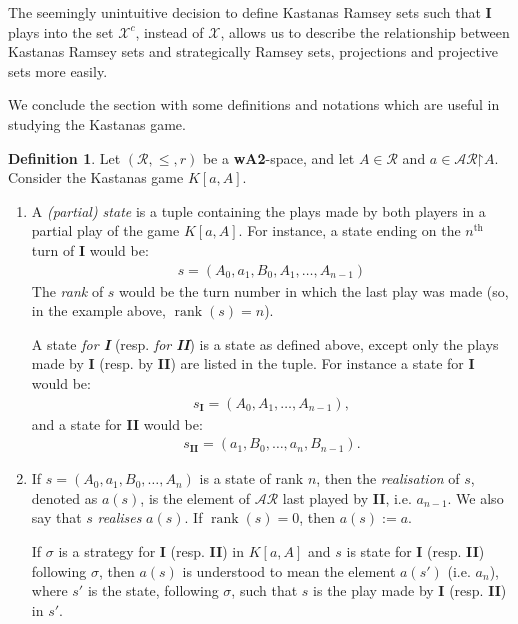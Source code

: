 \documentclass[11pt,reqno]{amsart}
\theoremstyle{plain}
\numberwithin{equation}{section}
\theoremstyle{definition}
\newtheorem{definition}[theorem]{Definition}
\newcommand{\func}{\operatorname}
\newcommand{\cal}{\mathcal}
\newcommand{\rank}{\func{rank}}
\newcommand{\restrictedto}{\mathord{\upharpoonright}}
\newcommand{\X}{\cal{X}}
\begin{document}
The seemingly unintuitive decision to define Kastanas Ramsey sets such that \textbf{I} plays into the set $\X^c$, instead of $\X$, allows us to describe the relationship between Kastanas Ramsey sets and strategically Ramsey sets, projections and projective sets more easily.

We conclude the section with some definitions and notations which are useful in studying the Kastanas game. 

\begin{definition}
\label{def:states}
    Let $(\cal{R},\leq,r)$ be a \textbf{wA2}-space, and let $A \in \cal{R}$ and $a \in \cal{AR}\restrictedto A$. Consider the Kastanas game $K[a,A]$.
    \begin{enumerate}
        \item A \emph{(partial) state} is a tuple containing the plays made by both players in a partial play of the game $K[a,A]$. For instance, a state ending on the $n^\text{th}$ turn of \textbf{I} would be:
        \begin{align*}
            s = (A_0,a_1,B_0,A_1,\dots,A_{n-1})
        \end{align*}
        The \emph{rank} of $s$ would be the turn number in which the last play was made (so, in the example above, $\rank(s) = n$).

        A state \emph{for \textbf{I}} (resp. \emph{for \textbf{II}}) is a state as defined above, except only the plays made by \textbf{I} (resp. by \textbf{II}) are listed in the tuple. For instance a state for \textbf{I} would be:
        \begin{align*}
            s_\textbf{I} = (A_0,A_1,\dots,A_{n-1}),
        \end{align*}
        and a state for \textbf{II} would be:
        \begin{align*}
            s_\textbf{II} = (a_1,B_0,\dots,a_n,B_{n-1}).
        \end{align*}

        \item If $s = (A_0,a_1,B_0,\dots,A_n)$ is a state of rank $n$, then the \emph{realisation} of $s$, denoted as $a(s)$, is the element of $\cal{AR}$ last played by \textbf{II}, i.e. $a_{n-1}$. We also say that $s$ \emph{realises} $a(s)$. If $\rank(s) = 0$, then $a(s) := a$. 

        If $\sigma$ is a strategy for \textbf{I} (resp. \textbf{II}) in $K[a,A]$ and $s$ is state for \textbf{I} (resp. \textbf{II}) following $\sigma$, then $a(s)$ is understood to mean the element $a(s')$ (i.e. $a_n$), where $s'$ is the state, following $\sigma$, such that $s$ is the play made by \textbf{I} (resp. \textbf{II}) in $s'$.


\end{enumerate}
\end{definition}
\end{document}
